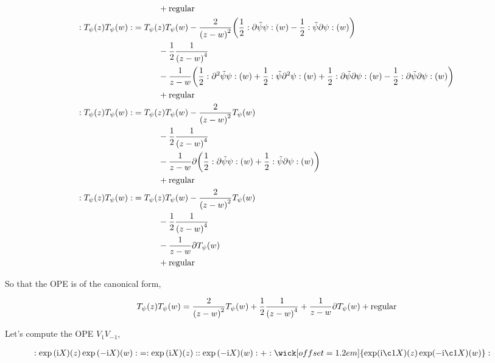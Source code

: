 \begin{align*}
    &\quad\quad\quad+\textnormal{regular}\\
    :T_\psi\qty(z)T_\psi\qty(w):&=T_\psi\qty(z)T_\psi\qty(w)-\frac{2}{\qty(z-w)^2}\qty(\frac12:\partial\tilde\psi\psi:\qty(w)-\frac12:\tilde\psi\partial\psi:\qty(w))\\
    &\quad\quad\quad-\frac12\frac{1}{\qty(z-w)^4}\\
    &\quad\quad\quad-\frac{1}{z-w}\qty(\frac12:\partial^2\tilde\psi\psi:\qty(w)+\frac12:\tilde\psi\partial^2\psi:\qty(w)+\frac12:\partial\tilde\psi\partial\psi:\qty(w)-\frac12:\partial\tilde\psi\partial\psi:\qty(w))\\
    &\quad\quad\quad+\textnormal{regular}\\
    :T_\psi\qty(z)T_\psi\qty(w):&=T_\psi\qty(z)T_\psi\qty(w)-\frac{2}{\qty(z-w)^2}T_\psi\qty(w)\\
    &\quad\quad\quad-\frac12\frac{1}{\qty(z-w)^4}\\
    &\quad\quad\quad-\frac{1}{z-w}\partial\qty(\frac12:\partial\tilde\psi\psi:\qty(w)+\frac12:\tilde\psi\partial\psi:\qty(w))\\
    &\quad\quad\quad+\textnormal{regular}\\
    :T_\psi\qty(z)T_\psi\qty(w):&=T_\psi\qty(z)T_\psi\qty(w)-\frac{2}{\qty(z-w)^2}T_\psi\qty(w)\\
    &\quad\quad\quad-\frac12\frac{1}{\qty(z-w)^4}\\
    &\quad\quad\quad-\frac{1}{z-w}\partial T_\psi\qty(w)\\
    &\quad\quad\quad+\textnormal{regular}
\end{align*}

So that the OPE is of the canonical form,

\begin{align*}
    T_\psi\qty(z)T_\psi\qty(w)=\frac{2}{\qty(z-w)^2}T_\psi\qty(w)+\frac12\frac{1}{\qty(z-w)^4}+\frac{1}{z-w}\partial T_\psi\qty(w)+\textnormal{regular}
\end{align*}

\probitem{}

Let's compute the OPE $V_1V_{-1}$,

\begin{align*}
    \cnord{\exp\qty(\im X)\qty(z)\exp\qty(-\im X)\qty(w)}&=\cnord{\exp\qty(\im X)\qty(z)}\cnord{\exp\qty(-\im X)\qty(w)}+\cnord{\wick[offset=1.2em]{\textnormal{exp}(\im \c1{X})\qty(z)\exp(-\im \c1{X})\qty(w)}}
\end{align*}

